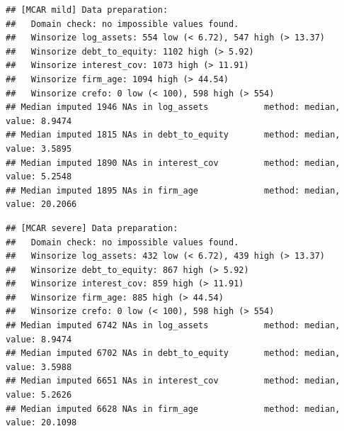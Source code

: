 \documentclass[
]{article}
\newenvironment{Shaded}{\begin{snugshade}}{\end{snugshade}}
\newcommand{\AttributeTok}[1]{\textcolor[rgb]{0.13,0.29,0.53}{#1}}
\newcommand{\FunctionTok}[1]{\textcolor[rgb]{0.13,0.29,0.53}{\textbf{#1}}}
\newcommand{\NormalTok}[1]{#1}
\newcommand{\OtherTok}[1]{\textcolor[rgb]{0.56,0.35,0.01}{#1}}
\newcommand{\SpecialCharTok}[1]{\textcolor[rgb]{0.81,0.36,0.00}{\textbf{#1}}}
\newcommand{\StringTok}[1]{\textcolor[rgb]{0.31,0.60,0.02}{#1}}
\begin{document}
\begin{verbatim}
## [MCAR mild] Data preparation:
##   Domain check: no impossible values found.
##   Winsorize log_assets: 554 low (< 6.72), 547 high (> 13.37)
##   Winsorize debt_to_equity: 1102 high (> 5.92)
##   Winsorize interest_cov: 1073 high (> 11.91)
##   Winsorize firm_age: 1094 high (> 44.54)
##   Winsorize crefo: 0 low (< 100), 598 high (> 554)
## Median imputed 1946 NAs in log_assets           method: median, value: 8.9474
## Median imputed 1815 NAs in debt_to_equity       method: median, value: 3.5895
## Median imputed 1890 NAs in interest_cov         method: median, value: 5.2548
## Median imputed 1895 NAs in firm_age             method: median, value: 20.2066
\end{verbatim}

\begin{Shaded}
\end{Shaded}

\begin{verbatim}
## [MCAR severe] Data preparation:
##   Domain check: no impossible values found.
##   Winsorize log_assets: 432 low (< 6.72), 439 high (> 13.37)
##   Winsorize debt_to_equity: 867 high (> 5.92)
##   Winsorize interest_cov: 859 high (> 11.91)
##   Winsorize firm_age: 885 high (> 44.54)
##   Winsorize crefo: 0 low (< 100), 598 high (> 554)
## Median imputed 6742 NAs in log_assets           method: median, value: 8.9474
## Median imputed 6702 NAs in debt_to_equity       method: median, value: 3.5988
## Median imputed 6651 NAs in interest_cov         method: median, value: 5.2626
## Median imputed 6628 NAs in firm_age             method: median, value: 20.1098
\end{verbatim}

\begin{Shaded}
\end{Shaded}
\end{document}

